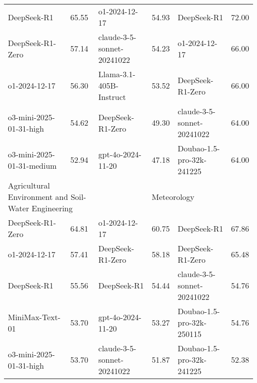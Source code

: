 {\begin{longtable}{p{4.2cm}>{\centering\arraybackslash} p{0.8cm}|p{4.2cm} >{\centering\arraybackslash} p{0.8cm}|p{4.2cm} >{\centering\arraybackslash} p{0.8cm}}
\hline
\cellcolor{blue!5} DeepSeek-R1 & \cellcolor{blue!2}65.55 & \cellcolor{brown!5} o1-2024-12-17 & \cellcolor{brown!2} 54.93 & \cellcolor{green!5} DeepSeek-R1 & \cellcolor{green!2} 72.00\\
\cellcolor{blue!5} DeepSeek-R1-Zero & \cellcolor{blue!2}57.14 & \cellcolor{brown!5} claude-3-5-sonnet-20241022 & \cellcolor{brown!2} 54.23 & \cellcolor{green!5} o1-2024-12-17 & \cellcolor{green!2} 66.00\\
\cellcolor{blue!5} o1-2024-12-17 & \cellcolor{blue!2}56.30 & \cellcolor{brown!5} Llama-3.1-405B-Instruct & \cellcolor{brown!2} 53.52 & \cellcolor{green!5} DeepSeek-R1-Zero & \cellcolor{green!2} 66.00\\
\cellcolor{blue!5} o3-mini-2025-01-31-high & \cellcolor{blue!2}54.62 & \cellcolor{brown!5} DeepSeek-R1-Zero & \cellcolor{brown!2} 49.30 & \cellcolor{green!5} claude-3-5-sonnet-20241022 & \cellcolor{green!2} 64.00\\
\cellcolor{blue!5} o3-mini-2025-01-31-medium & \cellcolor{blue!2}52.94 & \cellcolor{brown!5} gpt-4o-2024-11-20 & \cellcolor{brown!2} 47.18 & \cellcolor{green!5} Doubao-1.5-pro-32k-241225 & \cellcolor{green!2} 64.00\\
\hline
\multicolumn{2}{p{5.15cm}|}{\cellcolor{blue!10} \centering Agricultural Environment and Soil-Water Engineering} & \multicolumn{2}{p{5.15cm}|}{\cellcolor{brown!10} \centering World History} & \multicolumn{2}{p{5.15cm}}{\cellcolor{green!10} \centering Meteorology}\\
\hline
\cellcolor{blue!5} DeepSeek-R1-Zero & \cellcolor{blue!2}64.81 & \cellcolor{brown!5} o1-2024-12-17 & \cellcolor{brown!2} 60.75 & \cellcolor{green!5} DeepSeek-R1 & \cellcolor{green!2} 67.86\\
\cellcolor{blue!5} o1-2024-12-17 & \cellcolor{blue!2}57.41 & \cellcolor{brown!5} DeepSeek-R1-Zero & \cellcolor{brown!2} 58.18 & \cellcolor{green!5} DeepSeek-R1-Zero & \cellcolor{green!2} 65.48\\
\cellcolor{blue!5} DeepSeek-R1 & \cellcolor{blue!2}55.56 & \cellcolor{brown!5} DeepSeek-R1 & \cellcolor{brown!2} 54.44 & \cellcolor{green!5} claude-3-5-sonnet-20241022 & \cellcolor{green!2} 54.76\\
\cellcolor{blue!5} MiniMax-Text-01 & \cellcolor{blue!2}53.70 & \cellcolor{brown!5} gpt-4o-2024-11-20 & \cellcolor{brown!2} 53.27 & \cellcolor{green!5} Doubao-1.5-pro-32k-250115 & \cellcolor{green!2} 54.76\\
\cellcolor{blue!5} o3-mini-2025-01-31-high & \cellcolor{blue!2}53.70 & \cellcolor{brown!5} claude-3-5-sonnet-20241022 & \cellcolor{brown!2} 51.87 & \cellcolor{green!5} Doubao-1.5-pro-32k-241225 & \cellcolor{green!2} 52.38\\

\end{longtable}}
